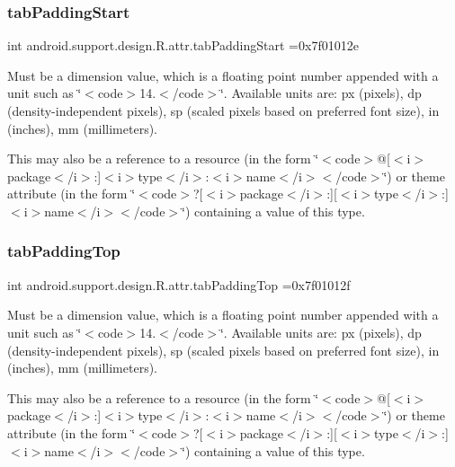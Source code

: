 \subsubsection{\texorpdfstring{tab\+Padding\+Start}{tabPaddingStart}}
{\footnotesize\ttfamily int android.\+support.\+design.\+R.\+attr.\+tab\+Padding\+Start =0x7f01012e\hspace{0.3cm}{\ttfamily [static]}}

Must be a dimension value, which is a floating point number appended with a unit such as \char`\"{}$<$code$>$14.\+5sp$<$/code$>$\char`\"{}. Available units are\+: px (pixels), dp (density-\/independent pixels), sp (scaled pixels based on preferred font size), in (inches), mm (millimeters). 

This may also be a reference to a resource (in the form \char`\"{}$<$code$>$@\mbox{[}$<$i$>$package$<$/i$>$\+:\mbox{]}$<$i$>$type$<$/i$>$\+:$<$i$>$name$<$/i$>$$<$/code$>$\char`\"{}) or theme attribute (in the form \char`\"{}$<$code$>$?\mbox{[}$<$i$>$package$<$/i$>$\+:\mbox{]}\mbox{[}$<$i$>$type$<$/i$>$\+:\mbox{]}$<$i$>$name$<$/i$>$$<$/code$>$\char`\"{}) containing a value of this type. \mbox{\label{classandroid_1_1support_1_1design_1_1R_1_1attr_a0a45c9281015bec36a61c5dc4cdaa0b5}} 
\subsubsection{\texorpdfstring{tab\+Padding\+Top}{tabPaddingTop}}
{\footnotesize\ttfamily int android.\+support.\+design.\+R.\+attr.\+tab\+Padding\+Top =0x7f01012f\hspace{0.3cm}{\ttfamily [static]}}

Must be a dimension value, which is a floating point number appended with a unit such as \char`\"{}$<$code$>$14.\+5sp$<$/code$>$\char`\"{}. Available units are\+: px (pixels), dp (density-\/independent pixels), sp (scaled pixels based on preferred font size), in (inches), mm (millimeters). 

This may also be a reference to a resource (in the form \char`\"{}$<$code$>$@\mbox{[}$<$i$>$package$<$/i$>$\+:\mbox{]}$<$i$>$type$<$/i$>$\+:$<$i$>$name$<$/i$>$$<$/code$>$\char`\"{}) or theme attribute (in the form \char`\"{}$<$code$>$?\mbox{[}$<$i$>$package$<$/i$>$\+:\mbox{]}\mbox{[}$<$i$>$type$<$/i$>$\+:\mbox{]}$<$i$>$name$<$/i$>$$<$/code$>$\char`\"{}) containing a value of this type. \mbox{\label{classandroid_1_1support_1_1design_1_1R_1_1attr_aabda887914ba6ed007645ca2c65c3d90}} 
